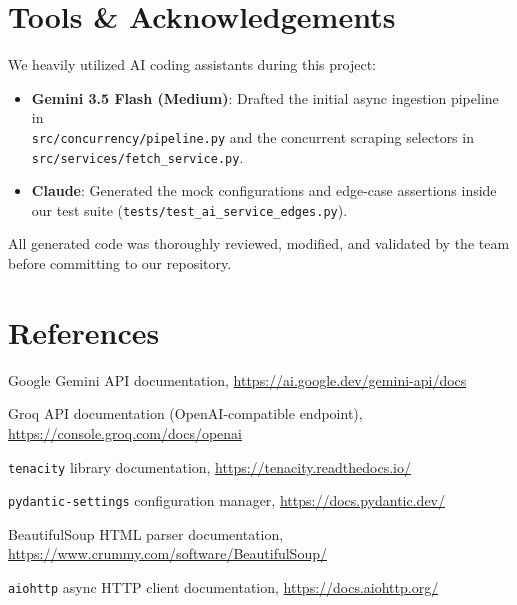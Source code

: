 \documentclass[11pt,a4paper]{article}
\begin{document}
\section{Tools \& Acknowledgements}\label{sec:tools}

We heavily utilized AI coding assistants during this project:
\begin{itemize}
    \item \textbf{Gemini 3.5 Flash (Medium)}: Drafted the initial async ingestion pipeline in
 \\\texttt{src/concurrency/pipeline.py} and the concurrent scraping selectors in 
\\ \texttt{src/services/fetch\_service.py}.
    \item \textbf{Claude}: Generated the mock configurations and edge-case assertions inside our test suite (\texttt{tests/test\_ai\_service\_edges.py}).
\end{itemize}

All generated code was thoroughly reviewed, modified, and validated by the team before committing to our repository.

\section*{References}

\begin{enumerate}[label={[\arabic*]},leftmargin=2.4em,itemsep=2pt]
  \item Google Gemini API documentation, \url{https://ai.google.dev/gemini-api/docs}
  \item Groq API documentation (OpenAI-compatible endpoint), \url{https://console.groq.com/docs/openai}
  \item \texttt{tenacity} library documentation, \url{https://tenacity.readthedocs.io/}
  \item \texttt{pydantic-settings} configuration manager, \url{https://docs.pydantic.dev/}
  \item BeautifulSoup HTML parser documentation, \url{https://www.crummy.com/software/BeautifulSoup/}
  \item \texttt{aiohttp} async HTTP client documentation, \url{https://docs.aiohttp.org/}
\end{enumerate}

\appendix
\end{document}
